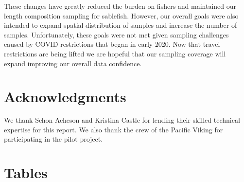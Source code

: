 \documentclass[12pt]{article}\usepackage[]{graphicx}\usepackage[]{color}
\begin{document}
These changes have greatly reduced the burden on fishers and maintained our length composition sampling for sablefish. However, our overall goals were also intended to expand spatial distribution of samples and increase the number of samples. Unfortunately, these goals were not met given sampling challenges caused by COVID restrictions that began in early 2020. Now that travel restrictions are being lifted we are hopeful that our sampling coverage will expand improving our overall data confidence.

\hypertarget{acknowledgments}{%
\section{Acknowledgments}\label{acknowledgments}}

We thank Schon Acheson and Kristina Castle for lending their skilled technical expertise for this report. We also thank the crew of the Pacific Viking for participating in the pilot project.

\clearpage

\hypertarget{tables}{%
\section{Tables}\label{tables}}
\end{document}
